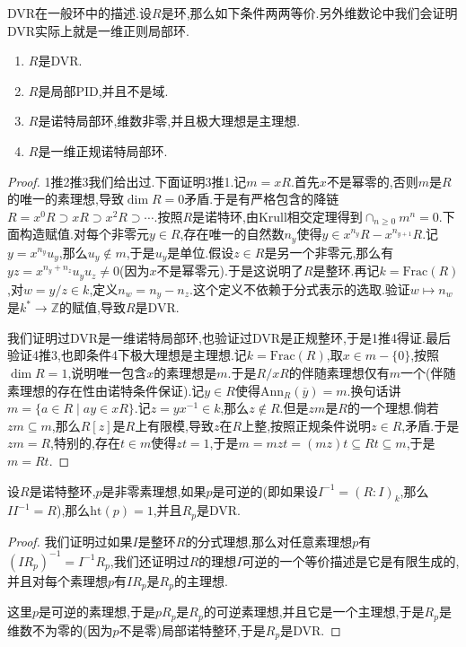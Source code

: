 DVR在一般环中的描述.设$R$是环,那么如下条件两两等价.另外维数论中我们会证明DVR实际上就是一维正则局部环.
\begin{enumerate}
	\item $R$是DVR.
	\item $R$是局部PID,并且不是域.
	\item $R$是诺特局部环,维数非零,并且极大理想是主理想.
	\item $R$是一维正规诺特局部环.
\end{enumerate}
\begin{proof}
	
	1推2推3我们给出过.下面证明3推1.记$m=xR$.首先$x$不是幂零的,否则$m$是$R$的唯一的素理想,导致$\dim R=0$矛盾.于是有严格包含的降链$R=x^0R\supset xR\supset x^2R\supset\cdots$.按照$R$是诺特环,由Krull相交定理得到$\cap_{n\ge0}m^n=0$.下面构造赋值.对每个非零元$y\in R$,存在唯一的自然数$n_y$使得$y\in x^{n_y}R-x^{n_{y+1}}R$.记$y=x^{n_y}u_y$,那么$u_y\not\in m$,于是$u_y$是单位.假设$z\in R$是另一个非零元,那么有$yz=x^{n_y+n_z}u_yu_z\not=0$(因为$x$不是幂零元).于是这说明了$R$是整环.再记$k=\mathrm{Frac}(R)$,对$w=y/z\in k$,定义$n_w=n_y-n_z$.这个定义不依赖于分式表示的选取.验证$w\mapsto n_w$是$k^*\to\mathbb{Z}$的赋值,导致$R$是DVR.
	
	我们证明过DVR是一维诺特局部环,也验证过DVR是正规整环,于是1推4得证.最后验证4推3,也即条件4下极大理想是主理想.记$k=\mathrm{Frac}(R)$,取$x\in m-\{0\}$,按照$\dim R=1$,说明唯一包含$x$的素理想是$m$.于是$R/xR$的伴随素理想仅有$m$一个(伴随素理想的存在性由诺特条件保证).记$y\in R$使得$\mathrm{Ann}_R(\overline{y})=m$.换句话讲$m=\{a\in R\mid ay\in xR\}$.记$z=yx^{-1}\in k$,那么$z\not\in R$.但是$zm$是$R$的一个理想.倘若$zm\subseteq m$,那么$R[z]$是$R$上有限模,导致$z$在$R$上整,按照正规条件说明$z\in R$,矛盾.于是$zm=R$,特别的,存在$t\in m$使得$zt=1$,于是$m=mzt=(mz)t\subseteq Rt\subseteq m$,于是$m=Rt$.
\end{proof}

设$R$是诺特整环,$p$是非零素理想,如果$p$是可逆的(即如果设$I^{-1}=(R:I)_k$,那么$II^{-1}=R$),那么$\mathrm{ht}(p)=1$,并且$R_p$是DVR.
\begin{proof}
	
	我们证明过如果$I$是整环$R$的分式理想,那么对任意素理想$p$有$(IR_p)^{-1}=I^{-1}R_p$,我们还证明过$R$的理想$I$可逆的一个等价描述是它是有限生成的,并且对每个素理想$p$有$IR_p$是$R_p$的主理想.
	
	这里$p$是可逆的素理想,于是$pR_p$是$R_p$的可逆素理想,并且它是一个主理想,于是$R_p$是维数不为零的(因为$p$不是零)局部诺特整环,于是$R_p$是DVR.
\end{proof}

